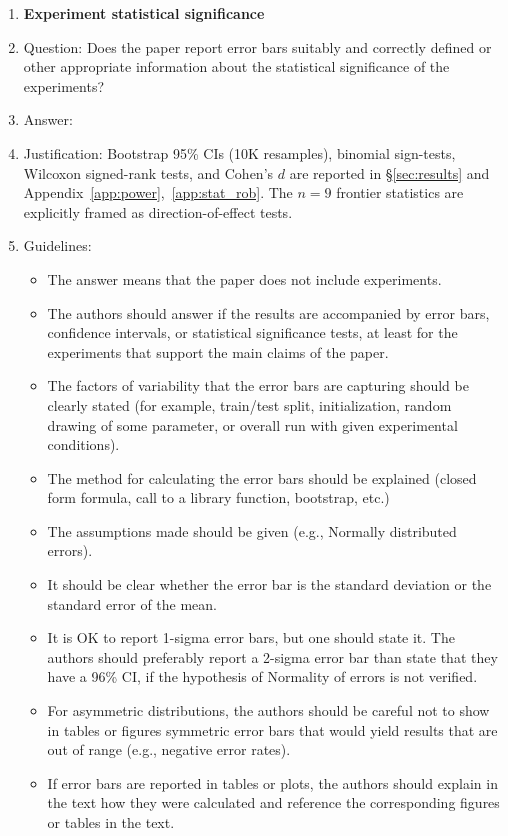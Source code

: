 \documentclass[11pt]{article}
\begin{document}
\begin{enumerate}
\item {\bf Experiment statistical significance}
    \item[] Question: Does the paper report error bars suitably and correctly defined or other appropriate information about the statistical significance of the experiments?
    \item[] Answer: \answerYes{}
    \item[] Justification: Bootstrap 95\% CIs (10K resamples), binomial sign-tests, Wilcoxon signed-rank tests, and Cohen's $d$ are reported in \S\ref{sec:results} and Appendix~\ref{app:power},~\ref{app:stat_rob}. The $n{=}9$ frontier statistics are explicitly framed as direction-of-effect tests.
    \item[] Guidelines:
    \begin{itemize}
        \item The answer \answerNA{} means that the paper does not include experiments.
        \item The authors should answer \answerYes{} if the results are accompanied by error bars, confidence intervals, or statistical significance tests, at least for the experiments that support the main claims of the paper.
        \item The factors of variability that the error bars are capturing should be clearly stated (for example, train/test split, initialization, random drawing of some parameter, or overall run with given experimental conditions).
        \item The method for calculating the error bars should be explained (closed form formula, call to a library function, bootstrap, etc.)
        \item The assumptions made should be given (e.g., Normally distributed errors).
        \item It should be clear whether the error bar is the standard deviation or the standard error of the mean.
        \item It is OK to report 1-sigma error bars, but one should state it. The authors should preferably report a 2-sigma error bar than state that they have a 96\% CI, if the hypothesis of Normality of errors is not verified.
        \item For asymmetric distributions, the authors should be careful not to show in tables or figures symmetric error bars that would yield results that are out of range (e.g., negative error rates).
        \item If error bars are reported in tables or plots, the authors should explain in the text how they were calculated and reference the corresponding figures or tables in the text.
    \end{itemize}


\end{enumerate}
\end{document}
